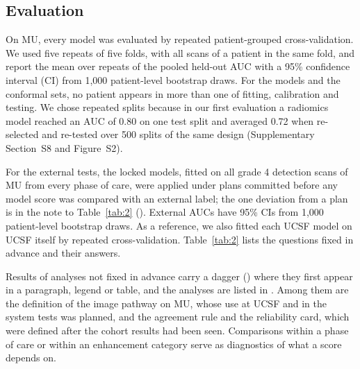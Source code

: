 \documentclass[largeformat]{interact} %
\begin{document}
\subsection{Evaluation}\label{sec:2.3}

On MU, every model was evaluated by repeated patient-grouped cross-validation. We used five repeats of five folds,
with all scans of a patient in the same fold, and report the mean over repeats of the pooled held-out AUC with a 95\%
confidence interval (CI) from 1,000 patient-level bootstrap draws. For the models and the conformal sets, no
patient appears in more than one of fitting, calibration and testing. We chose repeated splits because in our first evaluation a radiomics model reached an AUC of
0.80 on one test split and averaged 0.72 when re-selected and re-tested over 500 splits of the same design
(Supplementary Section~S8 and Figure~S2).

For the external tests, the locked models, fitted on all grade 4 detection scans of MU from every phase of care,
were applied under plans committed before any model score was compared with an external label; the one deviation from a plan is in the note
to Table~\ref{tab:2} ().
External AUCs have 95\% CIs from 1,000 patient-level bootstrap draws. As a reference, we also fitted each
UCSF model on UCSF itself by repeated cross-validation. Table~\ref{tab:2} lists the questions fixed in advance and
their answers.

Results of analyses not fixed in advance carry a dagger (\textdagger) where they first appear in a paragraph,
legend or table, and the analyses are listed in . Among
them are the definition of the image pathway on MU, whose use at UCSF and in the system tests was planned, and the
agreement rule and the reliability card, which were defined after the cohort results had been seen. Comparisons
within a phase of care or within an enhancement category serve as diagnostics of what a score depends on.
\end{document}
